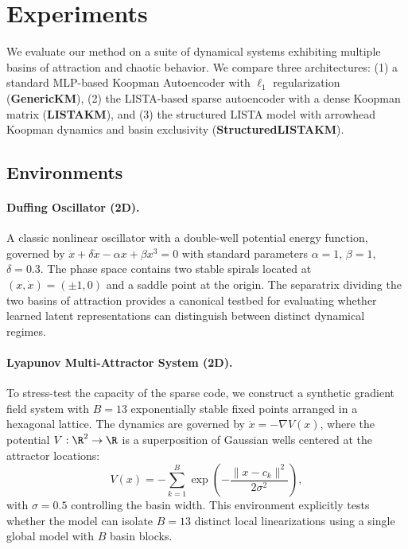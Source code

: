 

\section{Experiments}
\label{sec:experiments}

We evaluate our method on a suite of dynamical systems exhibiting multiple basins of attraction and chaotic behavior. We compare three architectures: (1) a standard MLP-based Koopman Autoencoder with $\ell_1$ regularization (\textbf{GenericKM}), (2) the LISTA-based sparse autoencoder with a dense Koopman matrix (\textbf{LISTAKM}), and (3) the structured LISTA model with arrowhead Koopman dynamics and basin exclusivity (\textbf{StructuredLISTAKM}).

\subsection{Environments}

\paragraph{Duffing Oscillator (2D).}
A classic nonlinear oscillator with a double-well potential energy function, governed by $\ddot{x} + \delta \dot{x} - \alpha x + \beta x^3 = 0$ with standard parameters $\alpha = 1$, $\beta = 1$, $\delta = 0.3$. The phase space contains two stable spirals located at $(x, \dot{x}) = (\pm 1, 0)$ and a saddle point at the origin. The separatrix dividing the two basins of attraction provides a canonical testbed for evaluating whether learned latent representations can distinguish between distinct dynamical regimes.

\paragraph{Lyapunov Multi-Attractor System (2D).}
To stress-test the capacity of the sparse code, we construct a synthetic gradient field system with $B = 13$ exponentially stable fixed points arranged in a hexagonal lattice. The dynamics are governed by $\dot{x} = -\nabla V(x)$, where the potential $V : \R^2 \to \R$ is a superposition of Gaussian wells centered at the attractor locations:
\begin{equation}
    V(x) = -\sum_{k=1}^{B} \exp\!\left( -\frac{\|x - c_k\|^2}{2\sigma^2} \right),
\end{equation}
with $\sigma = 0.5$ controlling the basin width. This environment explicitly tests whether the model can isolate $B = 13$ distinct local linearizations using a single global model with $B$ basin blocks.

